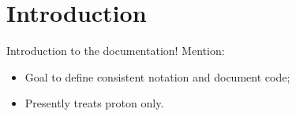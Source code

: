 \section{Introduction}

Introduction to the documentation!
Mention:
\begin{itemize}
  \item Goal to define consistent notation and document code;
  \item Presently treats proton only.
\end{itemize}

